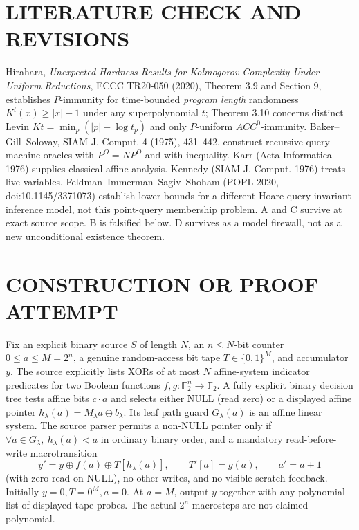 \documentclass[11pt]{article}
\begin{document}
\section{LITERATURE CHECK AND REVISIONS}
Hirahara, \emph{Unexpected Hardness Results for Kolmogorov Complexity Under Uniform Reductions}, ECCC TR20-050 (2020), Theorem 3.9 and Section 9, establishes \(P\)-immunity for time-bounded \emph{program length} randomness \(K^t(x)\ge |x|-1\) under any superpolynomial \(t\); Theorem 3.10 concerns distinct Levin \(Kt=\min_p(|p|+\log t_p)\) and only \(P\)-uniform \(ACC^0\)-immunity. Baker--Gill--Solovay, SIAM J. Comput. 4 (1975), 431--442, construct recursive query-machine oracles with \(P^O=NP^O\) and with inequality. Karr (Acta Informatica 1976) supplies classical affine analysis. Kennedy (SIAM J. Comput. 1976) treats live variables. Feldman--Immerman--Sagiv--Shoham (POPL 2020, doi:10.1145/3371073) establish lower bounds for a different Hoare-query invariant inference model, not this point-query membership problem. A and C survive at exact source scope. B is falsified below. D survives as a model firewall, not as a new unconditional existence theorem.

\section{CONSTRUCTION OR PROOF ATTEMPT}
Fix an explicit binary source \(S\) of length \(N\), an \(n\le N\)-bit counter \(0\le a\le M=2^n\), a genuine random-access bit tape \(T\in\{0,1\}^M\), and accumulator \(y\). The source explicitly lists XORs of at most \(N\) affine-system indicator predicates for two Boolean functions \(f,g\colon\mathbb F_2^n\to\mathbb F_2\). A fully explicit binary decision tree tests affine bits \(c\cdot a\) and selects either NULL (read zero) or a displayed affine pointer \(h_\lambda(a)=M_\lambda a\oplus b_\lambda\). Its leaf path guard \(G_\lambda(a)\) is an affine linear system. The source parser permits a non-NULL pointer only if \(\forall a\in G_\lambda,\ h_\lambda(a)<a\) in ordinary binary order, and a mandatory read-before-write macrotransition
\[
 y'=y\oplus f(a)\oplus T[h_\lambda(a)],\qquad T'[a]=g(a),\qquad a'=a+1
\]
(with zero read on NULL), no other writes, and no visible scratch feedback. Initially \(y=0,T=0^M,a=0\). At \(a=M\), output \(y\) together with any polynomial list of displayed tape probes. The actual \(2^n\) macrosteps are not claimed polynomial.
\end{document}
